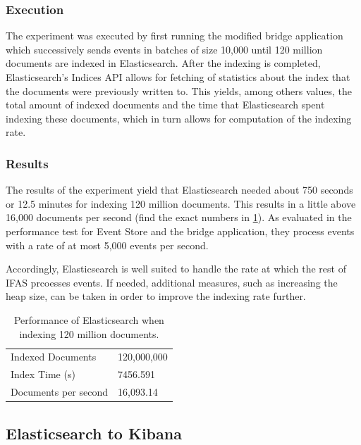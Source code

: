 \subsubsection{Execution}

The experiment was executed by first running the modified bridge application which successively sends events in batches of size 10,000 until 120 million documents are indexed in Elasticsearch.
After the indexing is completed, Elasticsearch's Indices API allows for fetching of statistics about the index that the documents were previously written to.
This yields, among others values, the total amount of indexed documents and the time that Elasticsearch spent indexing these documents, which in turn allows for computation of the indexing rate.

\subsubsection{Results}

The results of the experiment yield that Elasticsearch needed about 750 seconds or 12.5 minutes for indexing 120 million documents.
This results in a little above 16,000 documents per second (find the exact numbers in \cref{table:elasticsearch-performance}).
As evaluated in the performance test for Event Store and the bridge application, they process events with a rate of at most 5,000 events per second.

Accordingly, Elasticsearch is well suited to handle the rate at which the rest of \ac{IFAS} prcoesses events.
If needed, additional measures, such as increasing the heap size, can be taken in order to improve the indexing rate further.

\begin{table}
\caption{Performance of Elasticsearch when indexing 120 million documents.}
\label{table:elasticsearch-performance}
\centering
\begin{tabular}{ll}
Indexed Documents & 120,000,000 \\
Index Time (s) & 7456.591 \\
Documents per second & 16,093.14
\end{tabular}
\end{table}

\subsection{Elasticsearch to Kibana}
\label{subsec:evaluation:performance:kibana}

